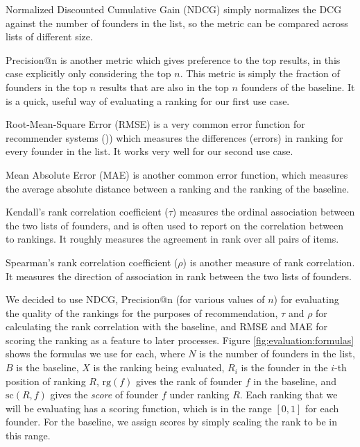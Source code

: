 Normalized Discounted Cumulative Gain (NDCG) simply normalizes the DCG against the number of founders in the list, so the metric can be compared across lists of different size.

Precision@n is another metric which gives preference to the top results, in this case explicitly only considering the top $n$. This metric is simply the fraction of founders in the top $n$ results that are also in the top $n$ founders of the baseline. It is a quick, useful way of evaluating a ranking for our first use case.

Root-Mean-Square Error (RMSE) is a very common error function for recommender systems (\cite{Cremonesi:2010:PRA:1864708.1864721})) which measures the differences (errors) in ranking for every founder in the list. It works very well for our second use case.

Mean Absolute Error (MAE) is another common error function, which measures the average absolute distance between a ranking and the ranking of the baseline.

Kendall's rank correlation coefficient ($\tau$) measures the ordinal association between the two lists of founders, and is often used to report on the correlation between to rankings. It roughly measures the agreement in rank over all pairs of items.

Spearman's rank correlation coefficient ($\rho$) is another measure of rank correlation. It measures the direction of association in rank between the two lists of founders.

We decided to use NDCG, Precision@n (for various values of $n$) for evaluating the quality of the rankings for the purposes of recommendation, $\tau$ and $\rho$ for calculating the rank correlation with the baseline, and RMSE and MAE for scoring the ranking as a feature to later processes. Figure \ref{fig:evaluation:formulas} shows the formulas we use for each, where $N$ is the number of founders in the list, $B$ is the baseline, $X$ is the ranking being evaluated, $R_i$ is the founder in the $i$-th position of ranking $R$, $\text{rg}(f)$ gives the rank of founder $f$ in the baseline, and $\text{sc}(R, f)$ gives the \textit{score} of founder $f$ under ranking $R$. Each ranking that we will be evaluating has a scoring function, which is in the range $[0, 1]$ for each founder. For the baseline, we assign scores by simply scaling the rank to be in this range.

